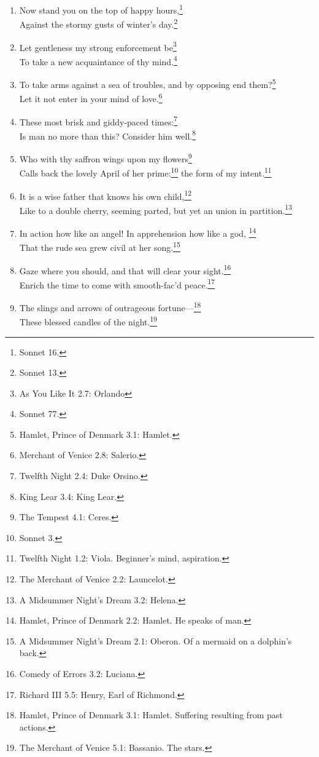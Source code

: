 \documentclass[17pt,twoside]{extarticle}
\begin{document}
\begin{enumerate}
\item
  Now stand you on the top of happy hours,\footnote{Sonnet 16.}\\Against
  the stormy gusts of winter's day.\footnote{Sonnet 13.}
\item
  Let gentleness my strong enforcement be\footnote{As You Like It 2.7:
    Orlando}\\To take a new acquaintance of thy mind.\footnote{Sonnet
    77.}
\item
  To take arms against a sea of troubles, and by opposing end
  them?\footnote{Hamlet, Prince of Denmark 3.1: Hamlet.}\\Let it not
  enter in your mind of love.\footnote{Merchant of Venice 2.8: Salerio.}
\item
  These most brisk and giddy-paced times:\footnote{Twelfth Night 2.4:
    Duke Orsino.}\\Is man no more than this? Consider him
  well.\footnote{King Lear 3.4: King Lear.}
\item
  Who with thy saffron wings upon my flowers\footnote{The Tempest 4.1:
    Ceres.}\\Calls back the lovely April of her prime:\footnote{Sonnet
    3.} the form of my intent.\footnote{Twelfth Night 1.2: Viola.
    Beginner's mind, aspiration.}
\item
  It is a wise father that knows his own child,\footnote{The Merchant of
    Venice 2.2: Launcelot.}\\Like to a double cherry, seeming parted,
  but yet an union in partition.\footnote{A Midsummer Night's Dream 3.2:
    Helena.}
\item
  In action how like an angel! In apprehension how like a god,
  \footnote{Hamlet, Prince of Denmark 2.2: Hamlet. He speaks of man.}\\That
  the rude sea grew civil at her song.\footnote{A Midsummer Night's
    Dream 2.1: Oberon. Of a mermaid on a dolphin's back.}
\item
  Gaze where you should, and that will clear your sight.\footnote{Comedy
    of Errors 3.2: Luciana.}\\Enrich the time to come with smooth-fac'd
  peace.\footnote{Richard III 5.5: Henry, Earl of Richmond.}
\item
  The slings and arrows of outrageous fortune---\footnote{Hamlet, Prince
    of Denmark 3.1: Hamlet. Suffering resulting from past actions.}\\These
  blessed candles of the night.\footnote{The Merchant of Venice 5.1:
    Bassanio. The stars.}

\end{enumerate}
\end{document}
